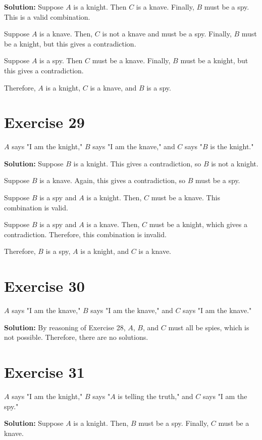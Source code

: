\documentclass{Axon}
\begin{document}
\noindent
\textbf{Solution:}
Suppose \(A\) is a knight. Then \(C\) is a knave. Finally, \(B\) must be a spy. This is a valid combination.

Suppose \(A\) is a knave. Then, \(C\) is not a knave and must be a spy. Finally, \(B\) must be a knight, but this gives a contradiction.

Suppose \(A\) is a spy. Then \(C\) must be a knave. Finally, \(B\) must be a knight, but this gives a contradiction.

Therefore, \(A\) is a knight, \(C\) is a knave, and \(B\) is a spy.

\section*{Exercise 29}
\(A\) says "I am the knight," \(B\) says "I am the knave," and \(C\) says "\(B\) is the knight."

\noindent
\textbf{Solution:}
Suppose \(B\) is a knight. This gives a contradiction, so \(B\) is not a knight.

Suppose \(B\) is a knave. Again, this gives a contradiction, so \(B\) must be a spy.

Suppose \(B\) is a spy and \(A\) is a knight. Then, \(C\) must be a knave. This combination is valid.

Suppose \(B\) is a spy and \(A\) is a knave. Then, \(C\) must be a knight, which gives a contradiction. Therefore, this combination is invalid.

Therefore, \(B\) is a spy, \(A\) is a knight, and \(C\) is a knave.

\section*{Exercise 30}
\(A\) says "I am the knave," \(B\) says "I am the knave," and \(C\) says "I am the knave."

\noindent
\textbf{Solution:}
By reasoning of Exercise 28, \(A\), \(B\), and \(C\) must all be spies, which is not possible. Therefore, there are no solutions.

\section*{Exercise 31}
\(A\) says "I am the knight," \(B\) says "\(A\) is telling the truth," and \(C\) says "I am the spy."

\noindent
\textbf{Solution:}
Suppose \(A\) is a knight. Then, \(B\) must be a spy. Finally, \(C\) must be a knave.
\end{document}
